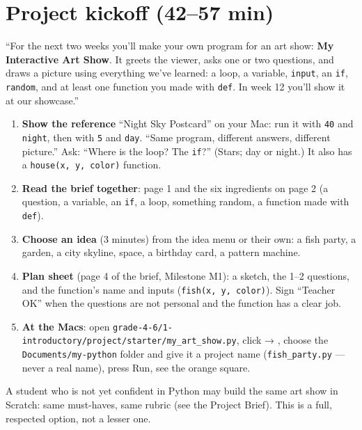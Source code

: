 \section{Project kickoff (42--57 min)}
\begin{teacherscript}
\enquote{For the next two weeks you'll make your own program for an art show: \textbf{My Interactive Art Show}. It greets the viewer, asks one or two questions, and draws a picture using everything we've learned: a loop, a variable, \texttt{input}, an \texttt{if}, \texttt{random}, and at least one function you made with \texttt{def}. In week 12 you'll show it at our showcase.}
\end{teacherscript}
\begin{enumerate}[leftmargin=1.4em,itemsep=2pt]
  \item \textbf{Show the reference} \enquote{Night Sky Postcard} on your Mac: run it with \texttt{40} and \texttt{night}, then with \texttt{5} and \texttt{day}. \enquote{Same program, different answers, different picture.} Ask: \enquote{Where is the loop? The \texttt{if}?} (Stars; day or night.) It also has a \texttt{house(x, y, color)} function.
  \item \textbf{Read the brief together}: page 1 and the six ingredients on page 2 (a question, a variable, an \texttt{if}, a loop, something random, a function made with \texttt{def}).
  \item \textbf{Choose an idea} (3 minutes) from the idea menu or their own: a fish party, a garden, a city skyline, space, a birthday card, a pattern machine.
  \item \textbf{Plan sheet} (page 4 of the brief, Milestone M1): a sketch, the 1--2 questions, and the function's name and inputs (\texttt{fish(x, y, color)}). Sign \enquote{Teacher OK} when the questions are not personal and the function has a clear job.
  \item \textbf{At the Macs}: open \texttt{grade-4-6/1-introductory/project/starter/my\_art\_show.py}, click  → , choose the \texttt{Documents/my-python} folder and give it a project name (\texttt{fish\_party.py} --- never a real name), press Run, see the orange square.
\end{enumerate}
\begin{teachernote}
A student who is not yet confident in Python may build the same art show in Scratch: same must-haves, same rubric (see the Project Brief). This is a full, respected option, not a lesser one.
\end{teachernote}

